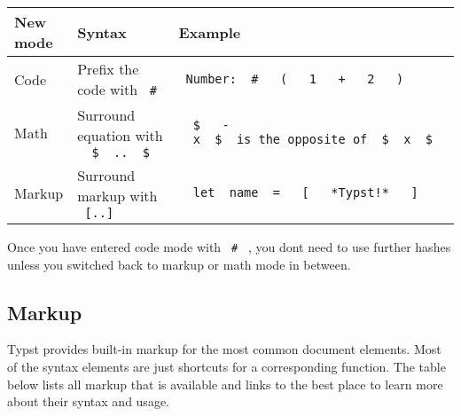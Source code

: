 \begin{longtable}[]{@{}lll@{}}
\toprule\noalign{}
New mode & Syntax & Example \\
\midrule\noalign{}
\endhead
\bottomrule\noalign{}
\endlastfoot
Code & Prefix the code with \texttt{\ \#\ } &
\texttt{\ Number:\ }{\texttt{\ \#\ }}\texttt{\ }{\texttt{\ (\ }}\texttt{\ }{\texttt{\ 1\ }}\texttt{\ }{\texttt{\ +\ }}\texttt{\ }{\texttt{\ 2\ }}\texttt{\ }{\texttt{\ )\ }}\texttt{\ } \\
Math & Surround equation with
\texttt{\ }{\texttt{\ \$\ }}\texttt{\ ..\ }{\texttt{\ \$\ }}\texttt{\ }
&
\texttt{\ }{\texttt{\ \$\ }}\texttt{\ }{\texttt{\ -\ }}\texttt{\ x\ }{\texttt{\ \$\ }}\texttt{\ is\ the\ opposite\ of\ }{\texttt{\ \$\ }}\texttt{\ x\ }{\texttt{\ \$\ }}\texttt{\ } \\
Markup & Surround markup with \texttt{\ {[}..{]}\ } &
\texttt{\ }{\texttt{\ let\ }}\texttt{\ name\ }{\texttt{\ =\ }}\texttt{\ }{\texttt{\ {[}\ }}\texttt{\ }{\texttt{\ *Typst!*\ }}\texttt{\ }{\texttt{\ {]}\ }}\texttt{\ } \\
\end{longtable}

Once you have entered code mode with \texttt{\ \#\ } , you
don\textquotesingle t need to use further hashes unless you switched
back to markup or math mode in between.

\subsection{Markup}\label{markup}

Typst provides built-in markup for the most common document elements.
Most of the syntax elements are just shortcuts for a corresponding
function. The table below lists all markup that is available and links
to the best place to learn more about their syntax and usage.

